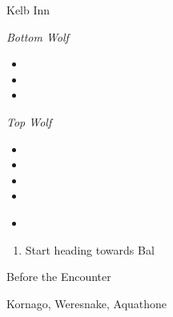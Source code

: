\begin{paracol}{2}
\begin{shop}{Kelb Inn}
    \varwb
    \begin{buy}
        \item \textit{Bottom Wolf}
        \begin{itemize}
            \item {} \speedDrink \space {}
            \item {} \heroDrink \space {}
            \item {} \revivify \space {}
        \end{itemize}
        \item \textit{Top Wolf}
        \item \begin{itemize}
            \item {} \hiPotion \space {}
            \item {} \antidote \space {}
            \item {} \eyedrop \space {}
            \item {} \maidensKiss \space {}
        \end{itemize}
    \end{buy}
    \begin{itemize}
        \item {}
    \end{itemize}
    \varwe
\end{shop}

\begin{enumerate}[resume]
    \item Start heading towards Bal
\end{enumerate}

\begin{menu}{Before the Encounter}
    \varwb
    \begin{itemMenu}
        \antidoteMenu {}
        \hiPotionMenu {}
    \end{itemMenu}
    \varwe
\end{menu}

\switchcolumn*
\begin{steproute}{Kornago, Weresnake, Aquathone}
\end{steproute}


\end{paracol}

